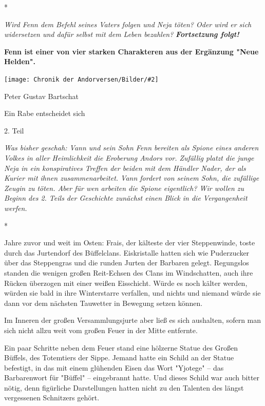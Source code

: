 \documentclass[10pt, a4paper, oneside]{book}
\newcommand{\bildmitts}[2][height=0.32\textwidth,width=0.48\textwidth,keepaspectratio]{%
    \begin{center}
        \texttt{[image: Chronik der Andorversen/Bilder/\#2]}
    \end{center}
}
\begin{document}
\begin{multicols}{2}
\begin{center}
    *
\end{center}

\textit{Wird Fenn dem Befehl seines Vaters folgen und Neja töten? Oder wird er sich widersetzen und dafür selbst mit dem Leben bezahlen?}
\textbf{\textit{Fortsetzung folgt!}}\bigskip

\textbf{Fenn ist einer von vier starken Charakteren aus der Ergänzung "Neue Helden".}\bigskip 



\bildmitts{Ein Rabe entscheidet sich Bild 2.jpg}

Peter Gustav Bartschat 

Ein Rabe entscheidet sich 

2. Teil\bigskip

\textit{Was bisher geschah: Vann und sein Sohn Fenn bereiten als Spione eines anderen Volkes in aller Heimlichkeit die Eroberung Andors vor. Zufällig platzt die junge Neja in ein konspiratives Treffen der beiden mit dem Händler Nader, der als Kurier mit ihnen zusammenarbeitet. Vann fordert von seinem Sohn, die zufällige Zeugin zu töten. Aber für wen arbeiten die Spione eigentlich? Wir wollen zu Beginn des 2. Teils der Geschichte zunächst einen Blick in die Vergangenheit werfen.}

\begin{center}
    *
\end{center}

Jahre zuvor und weit im Osten: Frais, der kälteste der vier Steppenwinde, toste durch das Jurtendorf des Büffelclans. Eiskristalle hatten sich wie Puderzucker über das Steppengras und die runden Jurten der Barbaren gelegt. Regungslos standen die wenigen großen Reit-Echsen des Clans im Windschatten, auch ihre Rücken überzogen mit einer weißen Eisschicht. Würde es noch kälter werden, würden sie bald in ihre Winterstarre verfallen, und nichts und niemand würde sie dann vor dem nächsten Tauwetter in Bewegung setzen können.

Im Inneren der großen Versammlungsjurte aber ließ es sich aushalten, sofern man sich nicht allzu weit vom großen Feuer in der Mitte entfernte.

Ein paar Schritte neben dem Feuer stand eine hölzerne Statue des Großen Büffels, des Totemtiers der Sippe. Jemand hatte ein Schild an der Statue befestigt, in das mit einem glühenden Eisen das Wort "Yjotege" – das Barbarenwort für "Büffel" – eingebrannt hatte. Und dieses Schild war auch bitter nötig, denn figürliche Darstellungen hatten nicht zu den Talenten des längst vergessenen Schnitzers gehört.


\end{multicols}
\end{document}
